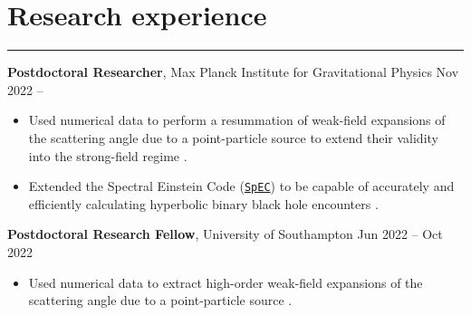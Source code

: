 \documentclass[10.5pt, oneside]{article}   	%
\begin{document}
 
 
\begin{center}
\huge
\href{mailto:oliver.long@aei.mpg.de}{} \:
\textcolor{Orcidcolour}{\href{https://orcid.org/0000-0002-3897-9272}{}} \:
\textcolor{RGcolour}{\href{https://www.researchgate.net/profile/Oliver-Long-3}{}} \:
\textcolor{LIcolour}{\href{https://www.linkedin.com/in/oliverflong/}{}} \:
\href{https://scholar.google.com/citations?user=92pSUO0AAAAJ&hl=en}{} \:
\href{https://oliverlong.info}{}
\end{center}

 \vspace{1mm}


{\color{Sectioncolour}
\section*{Research experience} 
\vspace{-3mm}
\noindent\rule{\linewidth}{0.6pt}}

\textbf{Postdoctoral Researcher}, Max Planck Institute for Gravitational Physics \hfill Nov 2022 --\\ \vspace{-5mm}
\begin{itemize}
\item Used numerical data to perform a resummation of weak-field expansions of the scattering angle due to a point-particle source to extend their validity into the strong-field regime \cite{Long:2024ltn}.
\item Extended the Spectral Einstein Code (\href{https://www.black-holes.org/for-researchers/spec}{\texttt{SpEC}}) to be capable of accurately and efficiently calculating hyperbolic binary black hole encounters \cite{NR:Prep,Scheel:2025jct}.
\end{itemize}

\textbf{Postdoctoral Research Fellow}, University of Southampton \hfill Jun 2022 -- Oct 2022\\ 
\vspace{-5mm}
\begin{itemize}
\item Used numerical data to extract high-order weak-field expansions of the scattering angle due to a point-particle source \cite{Barack:2023oqp}.
\end{itemize}
\end{document}
